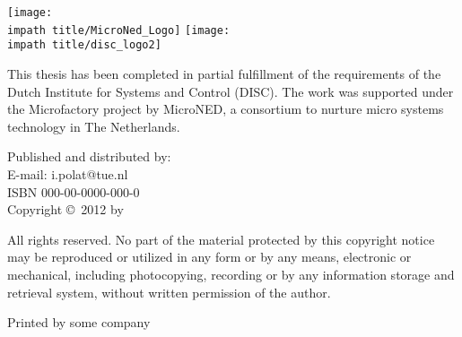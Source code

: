 
\noindent
{
\flushleft\texttt{[image: \\impath title/MicroNed\_Logo]}\hspace*{0.75cm}
\vspace{1em}
\texttt{[image: \\impath title/disc\_logo2]}
\vspace{1em}


\parbox{\textwidth}{\noindent This thesis has been completed in partial fulfillment of
the requirements of the Dutch Institute for Systems and Control
(DISC). The work was supported under the Microfactory project by
MicroNED, a consortium to nurture micro systems technology in
The Netherlands.
}
\bigskip{}


Published and distributed by: \theauthor \\
E-mail: i.polat@tue.nl\\

\bigskip{}
ISBN 000-00-0000-000-0\\
Copyright \copyright~2012 by \theauthor
}


\bigskip{}
\noindent All rights reserved. No part of the material protected by
this copyright notice may be reproduced or utilized in any form or
by any means, electronic or mechanical, including photocopying,
recording or by any information storage and retrieval system,
without written permission of the author.

\bigskip{}

\noindent Printed by some company
